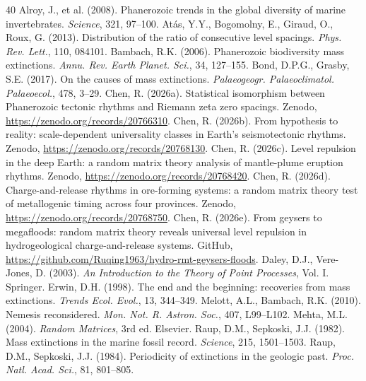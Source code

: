 \documentclass[12pt,a4paper]{article}
\begin{document}
\begin{thebibliography}{40}
 Alroy, J., et al. (2008). Phanerozoic trends in the global diversity of marine invertebrates. \textit{Science}, 321, 97--100.
 At\'as, Y.Y., Bogomolny, E., Giraud, O., Roux, G. (2013). Distribution of the ratio of consecutive level spacings. \textit{Phys. Rev. Lett.}, 110, 084101.
 Bambach, R.K. (2006). Phanerozoic biodiversity mass extinctions. \textit{Annu. Rev. Earth Planet. Sci.}, 34, 127--155.
 Bond, D.P.G., Grasby, S.E. (2017). On the causes of mass extinctions. \textit{Palaeogeogr. Palaeoclimatol. Palaeoecol.}, 478, 3--29.
 Chen, R. (2026a). Statistical isomorphism between Phanerozoic tectonic rhythms and Riemann zeta zero spacings. Zenodo, \url{https://zenodo.org/records/20766310}.
 Chen, R. (2026b). From hypothesis to reality: scale-dependent universality classes in Earth's seismotectonic rhythms. Zenodo, \url{https://zenodo.org/records/20768130}.
 Chen, R. (2026c). Level repulsion in the deep Earth: a random matrix theory analysis of mantle-plume eruption rhythms. Zenodo, \url{https://zenodo.org/records/20768420}.
 Chen, R. (2026d). Charge-and-release rhythms in ore-forming systems: a random matrix theory test of metallogenic timing across four provinces. Zenodo, \url{https://zenodo.org/records/20768750}.
 Chen, R. (2026e). From geysers to megafloods: random matrix theory reveals universal level repulsion in hydrogeological charge-and-release systems. GitHub, \url{https://github.com/Ruqing1963/hydro-rmt-geysers-floods}.
 Daley, D.J., Vere-Jones, D. (2003). \textit{An Introduction to the Theory of Point Processes}, Vol. I. Springer.
 Erwin, D.H. (1998). The end and the beginning: recoveries from mass extinctions. \textit{Trends Ecol. Evol.}, 13, 344--349.
 Melott, A.L., Bambach, R.K. (2010). Nemesis reconsidered. \textit{Mon. Not. R. Astron. Soc.}, 407, L99--L102.
 Mehta, M.L. (2004). \textit{Random Matrices}, 3rd ed. Elsevier.
 Raup, D.M., Sepkoski, J.J. (1982). Mass extinctions in the marine fossil record. \textit{Science}, 215, 1501--1503.
 Raup, D.M., Sepkoski, J.J. (1984). Periodicity of extinctions in the geologic past. \textit{Proc. Natl. Acad. Sci.}, 81, 801--805.

\end{thebibliography}
\end{document}
